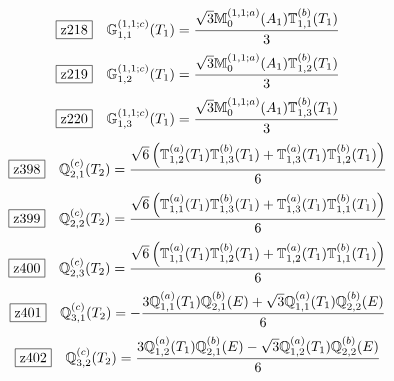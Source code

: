 \documentclass[fleqn,10pt,landscape]{jsarticle}
\begin{document}
\begin{dmath*}
\hspace*{3mm}\fbox{z218}\quad \mathbb{G}_{1,1}^{(1,1;c)}(T_{1})=\frac{\sqrt{3} \mathbb{M}_{0}^{(1,1;a)}(A_{1}) \mathbb{T}_{1,1}^{(b)}(T_{1})}{3}
\end{dmath*}
\begin{dmath*}
\hspace*{3mm}\fbox{z219}\quad \mathbb{G}_{1,2}^{(1,1;c)}(T_{1})=\frac{\sqrt{3} \mathbb{M}_{0}^{(1,1;a)}(A_{1}) \mathbb{T}_{1,2}^{(b)}(T_{1})}{3}
\end{dmath*}
\begin{dmath*}
\hspace*{3mm}\fbox{z220}\quad \mathbb{G}_{1,3}^{(1,1;c)}(T_{1})=\frac{\sqrt{3} \mathbb{M}_{0}^{(1,1;a)}(A_{1}) \mathbb{T}_{1,3}^{(b)}(T_{1})}{3}
\end{dmath*}
\begin{dmath*}
\hspace*{3mm}\fbox{z398}\quad \mathbb{Q}_{2,1}^{(c)}(T_{2})=\frac{\sqrt{6} \left(\mathbb{T}_{1,2}^{(a)}(T_{1}) \mathbb{T}_{1,3}^{(b)}(T_{1}) + \mathbb{T}_{1,3}^{(a)}(T_{1}) \mathbb{T}_{1,2}^{(b)}(T_{1})\right)}{6}
\end{dmath*}
\begin{dmath*}
\hspace*{3mm}\fbox{z399}\quad \mathbb{Q}_{2,2}^{(c)}(T_{2})=\frac{\sqrt{6} \left(\mathbb{T}_{1,1}^{(a)}(T_{1}) \mathbb{T}_{1,3}^{(b)}(T_{1}) + \mathbb{T}_{1,3}^{(a)}(T_{1}) \mathbb{T}_{1,1}^{(b)}(T_{1})\right)}{6}
\end{dmath*}
\begin{dmath*}
\hspace*{3mm}\fbox{z400}\quad \mathbb{Q}_{2,3}^{(c)}(T_{2})=\frac{\sqrt{6} \left(\mathbb{T}_{1,1}^{(a)}(T_{1}) \mathbb{T}_{1,2}^{(b)}(T_{1}) + \mathbb{T}_{1,2}^{(a)}(T_{1}) \mathbb{T}_{1,1}^{(b)}(T_{1})\right)}{6}
\end{dmath*}
\begin{dmath*}
\hspace*{3mm}\fbox{z401}\quad \mathbb{Q}_{3,1}^{(c)}(T_{2})=- \frac{3 \mathbb{Q}_{1,1}^{(a)}(T_{1}) \mathbb{Q}_{2,1}^{(b)}(E) + \sqrt{3} \mathbb{Q}_{1,1}^{(a)}(T_{1}) \mathbb{Q}_{2,2}^{(b)}(E)}{6}
\end{dmath*}
\begin{dmath*}
\hspace*{3mm}\fbox{z402}\quad \mathbb{Q}_{3,2}^{(c)}(T_{2})=\frac{3 \mathbb{Q}_{1,2}^{(a)}(T_{1}) \mathbb{Q}_{2,1}^{(b)}(E) - \sqrt{3} \mathbb{Q}_{1,2}^{(a)}(T_{1}) \mathbb{Q}_{2,2}^{(b)}(E)}{6}
\end{dmath*}
\end{document}
